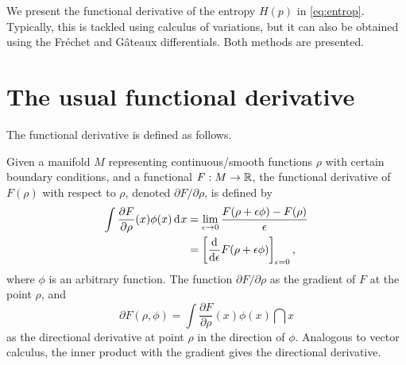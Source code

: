 We present the functional derivative of the entropy $H(p)$ in \cref{eq:entrop}.
Typically, this is tackled using calculus of variations, but it can also be obtained using the Fréchet and Gâteaux differentials.
Both methods are presented.

\section{The usual functional derivative}


The functional derivative is defined as follows.

\begin{definition}
  Given a manifold $M$ representing continuous/smooth functions $\rho$ with certain boundary conditions, and a functional $F:M\to\mathbb{R}$, the functional derivative of $F(\rho)$ with respect to $\rho$, denoted $\partial F/\partial\rho$, is defined by
  \begin{align*}
    \int \frac{\partial F}{\partial\rho}(x)\phi(x) \operatorname{d}\hspace{0.5pt}\! x
    &= \lim_{\epsilon\to 0} \frac{F(\rho + \epsilon\phi) - F(\rho)}{\epsilon} \\
    &= \left[ \frac{\text{d}}{\text{d} \epsilon} F(\rho + \epsilon\phi) \right]_{\epsilon=0},
  \end{align*}
  where $\phi$ is an arbitrary function.
  The function $\partial F/\partial\rho$ as the gradient of $F$ at the point $\rho$, and
  \[
    \partial F(\rho,\phi) = \int \frac{\partial F}{\partial\rho}(x)\phi(x) \dint x
  \]
  as the directional derivative at point $\rho$ in the direction of $\phi$.
  Analogous to vector calculus, the inner product with the gradient gives the directional derivative.
\end{definition}

